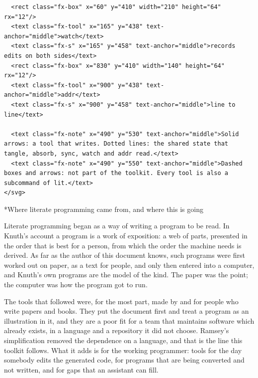 \documentclass[10pt,a4paper]{article}
\makeatletter
\renewcommand\section{\@startsection{section}{1}{\z@}{-3.2ex \@plus -1ex \@minus -.2ex}{1.2ex \@plus .2ex}{\normalfont\LARGE\itshape}}
\makeatother
\begin{document}
\begin{Verbatim}
  <rect class="fx-box" x="60" y="410" width="210" height="64" rx="12"/>
  <text class="fx-tool" x="165" y="438" text-anchor="middle">watch</text>
  <text class="fx-s" x="165" y="458" text-anchor="middle">records edits on both sides</text>
  <rect class="fx-box" x="830" y="410" width="140" height="64" rx="12"/>
  <text class="fx-tool" x="900" y="438" text-anchor="middle">addr</text>
  <text class="fx-s" x="900" y="458" text-anchor="middle">line to line</text>

  <text class="fx-note" x="490" y="530" text-anchor="middle">Solid arrows: a tool that writes. Dotted lines: the shared state that tangle, absorb, sync, watch and addr read.</text>
  <text class="fx-note" x="490" y="550" text-anchor="middle">Dashed boxes and arrows: not part of the toolkit. Every tool is also a subcommand of lit.</text>
</svg>
\end{Verbatim}

\hypertarget{h-Where-literate-programming-came-from-and-where-this-is-going}{}
\section*{Where literate programming came from, and where this is going}

Literate programming began as a way of writing a program to be read. In Knuth's account \cite{knuth1984lp} a program is a work of exposition: a web of parts, presented in the order that is best for a person, from which the order the machine needs is derived. As far as the author of this document knows, such programs were first worked out on paper, as a text for people, and only then entered into a computer, and Knuth's own programs are the model of the kind. The paper was the point; the computer was how the program got to run.

The tools that followed were, for the most part, made by and for people who write papers and books. They put the document first and treat a program as an illustration in it, and they are a poor fit for a team that maintains software which already exists, in a language and a repository it did not choose. Ramsey's simplification \cite{ramsey1994lp} removed the dependence on a language, and that is the line this toolkit follows. What it adds is for the working programmer: tools for the day somebody edits the generated code, for programs that are being converted and not written, and for gaps that an assistant can fill.
\end{document}
